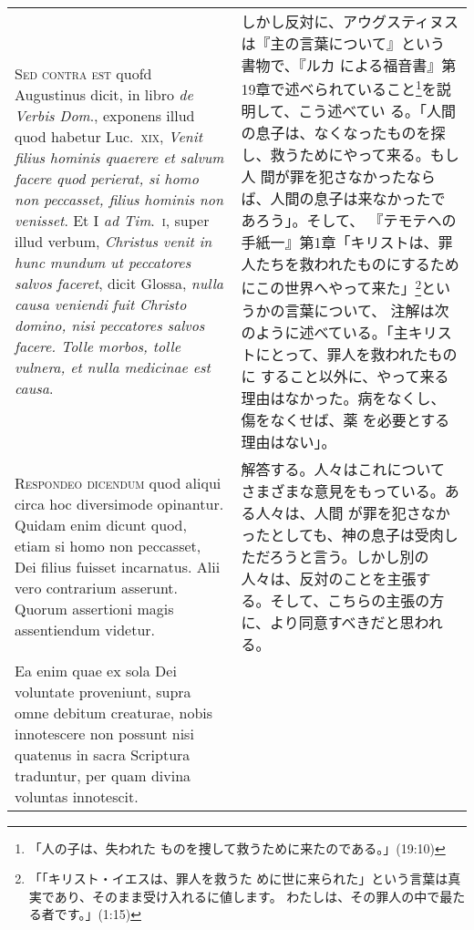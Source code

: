 \documentclass[10pt]{jsarticle} %
\begin{document}
\begin{longtable}{p{21em}p{21em}}
\\


{\scshape Sed contra est} quofd Augustinus dicit, in
libro {\itshape de Verbis Dom}., exponens illud quod habetur Luc.~{\scshape xix}, {\itshape Venit filius
hominis quaerere et salvum facere quod perierat, si homo non peccasset,
filius hominis non venisset}. Et I {\itshape ad Tim}.~{\scshape i}, super illud verbum,
{\itshape Christus venit in hunc mundum ut peccatores salvos faceret}, dicit
Glossa, {\itshape nulla causa veniendi fuit Christo domino, nisi peccatores salvos
facere. Tolle morbos, tolle vulnera, et nulla medicinae est causa}.


&


しかし反対に、アウグスティヌスは『主の言葉について』という書物で、『ルカ
 による福音書』第19章で述べられていること\footnote{「人の子は、失われた
 ものを捜して救うために来たのである。」(19:10)}を説明して、こう述べてい
 る。「人間の息子は、なくなったものを探し、救うためにやって来る。もし人
 間が罪を犯さなかったならば、人間の息子は来なかったであろう」。そして、
 『テモテへの手紙一』第1章「キリストは、罪人たちを救われたものにするため
 にこの世界へやって来た」\footnote{「「キリスト・イエスは、罪人を救うた
 めに世に来られた」という言葉は真実であり、そのまま受け入れるに値します。
 わたしは、その罪人の中で最たる者です。」(1:15)}というかの言葉について、
 注解は次のように述べている。「主キリストにとって、罪人を救われたものに
 すること以外に、やって来る理由はなかった。病をなくし、傷をなくせば、薬
 を必要とする理由はない」。


\\


{\scshape Respondeo dicendum} quod aliqui circa hoc
diversimode opinantur. Quidam enim dicunt quod, etiam si homo non
peccasset, Dei filius fuisset incarnatus. Alii vero contrarium
asserunt. Quorum assertioni magis assentiendum videtur. 


&

解答する。人々はこれについてさまざまな意見をもっている。ある人々は、人間
 が罪を犯さなかったとしても、神の息子は受肉しただろうと言う。しかし別の
 人々は、反対のことを主張する。そして、こちらの主張の方に、より同意すべきだと思われ
 る。

\\

Ea enim quae ex
sola Dei voluntate proveniunt, supra omne debitum creaturae, nobis
innotescere non possunt nisi quatenus in sacra Scriptura traduntur, per
quam divina voluntas innotescit. 


&


\end{longtable}
\end{document}
